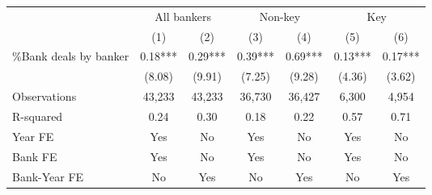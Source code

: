 {
\def\sym#1{\ifmmode^{#1}\else\(^{#1}\)\fi}
\begin{tabular*}{\hsize}{@{\hskip\tabcolsep\extracolsep\fill}l*{6}{c}}
\toprule
                &\multicolumn{2}{c}{All bankers}&\multicolumn{2}{c}{Non-key}&\multicolumn{2}{c}{Key}  \\\cmidrule(lr){2-3}\cmidrule(lr){4-5}\cmidrule(lr){6-7}
                &\multicolumn{1}{c}{(1)}   &\multicolumn{1}{c}{(2)}   &\multicolumn{1}{c}{(3)}   &\multicolumn{1}{c}{(4)}   &\multicolumn{1}{c}{(5)}   &\multicolumn{1}{c}{(6)}   \\
\midrule
\%Bank deals by banker&     0.18***&     0.29***&     0.39***&     0.69***&     0.13***&     0.17***\\
                &   (8.08)   &   (9.91)   &   (7.25)   &   (9.28)   &   (4.36)   &   (3.62)   \\
\midrule
Observations    &   43,233   &   43,233   &   36,730   &   36,427   &    6,300   &    4,954   \\
R-squared       &     0.24   &     0.30   &     0.18   &     0.22   &     0.57   &     0.71   \\
\midrule Year FE &      Yes   &       No   &      Yes   &       No   &      Yes   &       No   \\
Bank FE         &      Yes   &       No   &      Yes   &       No   &      Yes   &       No   \\
Bank-Year FE    &       No   &      Yes   &       No   &      Yes   &       No   &      Yes   \\
\bottomrule
\end{tabular*}
}
